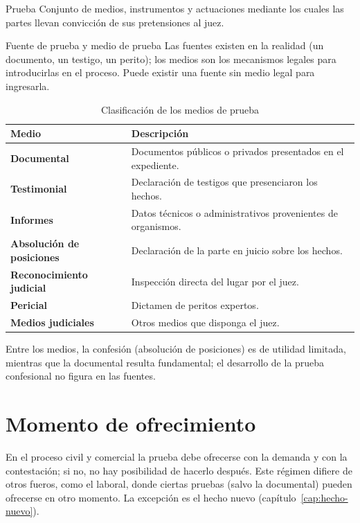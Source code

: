 \documentclass[12pt,oneside]{book}
\begin{document}
\begin{definicion}{Prueba}
Conjunto de medios, instrumentos y actuaciones mediante los cuales las partes llevan convicción de sus pretensiones al juez.
\end{definicion}

\begin{definicion}{Fuente de prueba y medio de prueba}
Las fuentes existen en la realidad (un documento, un testigo, un perito); los medios son los mecanismos legales para introducirlas en el proceso. Puede existir una fuente sin medio legal para ingresarla.
\end{definicion}

\begin{table}[H]
\centering
\caption{Clasificación de los medios de prueba}
\begin{tabularx}{\textwidth}{>{\raggedright\arraybackslash\bfseries}p{} X}
\toprule
Medio & Descripción \\
\midrule
Documental & Documentos públicos o privados presentados en el expediente. \\
Testimonial & Declaración de testigos que presenciaron los hechos. \\
Informes & Datos técnicos o administrativos provenientes de organismos. \\
Absolución de posiciones & Declaración de la parte en juicio sobre los hechos. \\
Reconocimiento judicial & Inspección directa del lugar por el juez. \\
Pericial & Dictamen de peritos expertos. \\
Medios judiciales & Otros medios que disponga el juez. \\
\bottomrule
\end{tabularx}
\end{table}

Entre los medios, la confesión (absolución de posiciones) es de utilidad limitada, mientras que la documental resulta fundamental; el desarrollo de la prueba confesional no figura en las fuentes.

\section{Momento de ofrecimiento}

\begin{importante}
En el proceso civil y comercial la prueba debe ofrecerse con la demanda y con la contestación; si no, no hay posibilidad de hacerlo después. Este régimen difiere de otros fueros, como el laboral, donde ciertas pruebas (salvo la documental) pueden ofrecerse en otro momento. La excepción es el hecho nuevo (capítulo~\ref{cap:hecho-nuevo}).
\end{importante}
\end{document}
